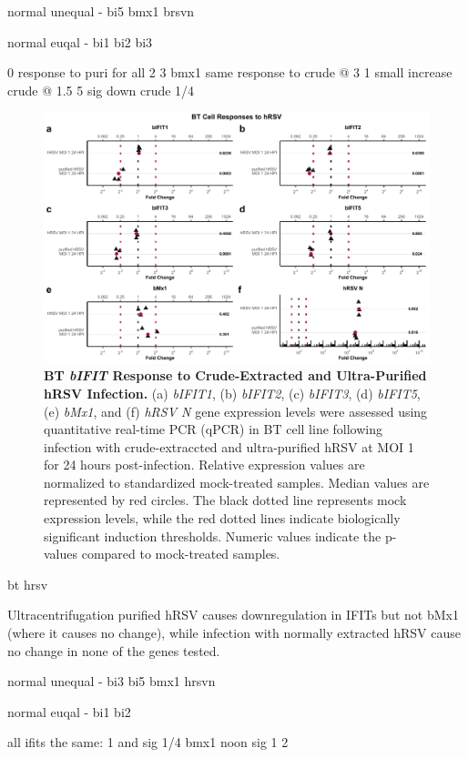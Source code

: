 normal unequal - bi5 bmx1 brsvn

normal euqal - bi1 bi2 bi3 

0 response to puri for all
2 3 bmx1 same response to crude @ 3
1 small increase crude @ 1.5
5 sig down crude 1/4


\begin{figure}
    \centering
    \includegraphics[width=1\linewidth]{07. Chapter 2/Figs/02. Induction/10. bt_hrsv.pdf}
    \caption[BT \textit{bIFIT} Response to Crude-Extracted and Ultra-Purified hRSV Infection.]{\textbf{BT \textit{bIFIT} Response to Crude-Extracted and Ultra-Purified hRSV Infection.} (a) \textit{bIFIT1}, (b) \textit{bIFIT2}, (c) \textit{bIFIT3}, (d) \textit{bIFIT5}, (e) \textit{bMx1}, and (f) \textit{hRSV N} gene expression levels were assessed using quantitative real-time PCR (qPCR) in BT cell line following infection with crude-extraccted and ultra-purified hRSV at MOI 1 for 24 hours post-infection. Relative expression values are normalized to standardized mock-treated samples. Median values are represented by red circles. The black dotted line represents mock expression levels, while the red dotted lines indicate biologically significant induction thresholds. Numeric values indicate the p-values compared to mock-treated samples.}
    \label{fig:Bt responses to hRSV}
\end{figure}

bt hrsv

Ultracentrifugation purified hRSV causes downregulation in IFITs but not bMx1 (where it causes no change), while infection with normally extracted hRSV cause no change in none of the genes tested. 

normal unequal - bi3 bi5 bmx1 hrsvn

normal euqal - bi1 bi2

all ifits the same: 1 and sig 1/4
bmx1 noon sig 1 2 